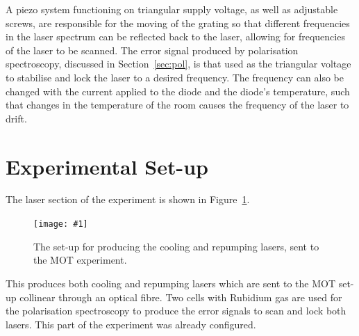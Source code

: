 \documentclass[twocolumn]{article}
\newcommand{\insertFigure}[1]{%
   \texttt{[image: \#1]}%
}
\begin{document}
A piezo system functioning on triangular supply voltage, as well as adjustable screws, are responsible for the moving of the grating so that different frequencies in the laser spectrum can be reflected back to the laser, allowing for frequencies of the laser to be scanned. The error signal produced by polarisation spectroscopy, discussed in Section~\ref{sec:pol}, is that used as the triangular voltage to stabilise and lock the laser to a desired frequency. The frequency can also be changed with the current applied to the diode and the diode's temperature, such that changes in the temperature of the room causes the frequency of the laser to drift.

\section{Experimental Set-up} \label{sec:Exp}
The laser section of the experiment is shown in Figure~\ref{fig:Laser}.
\begin{figure} [!h]
	\centering
	\insertFigure{Images/Laser.png}
	\caption{The set-up for producing the cooling and repumping lasers, sent to the MOT experiment.~\cite{manual}}
	\label{fig:Laser}
\end{figure}
This produces both cooling and repumping lasers which are sent to the MOT set-up collinear through an optical fibre. Two cells with Rubidium gas are used for the polarisation spectroscopy to produce the error signals to scan and lock both lasers. This part of the experiment was already configured.
\end{document}
